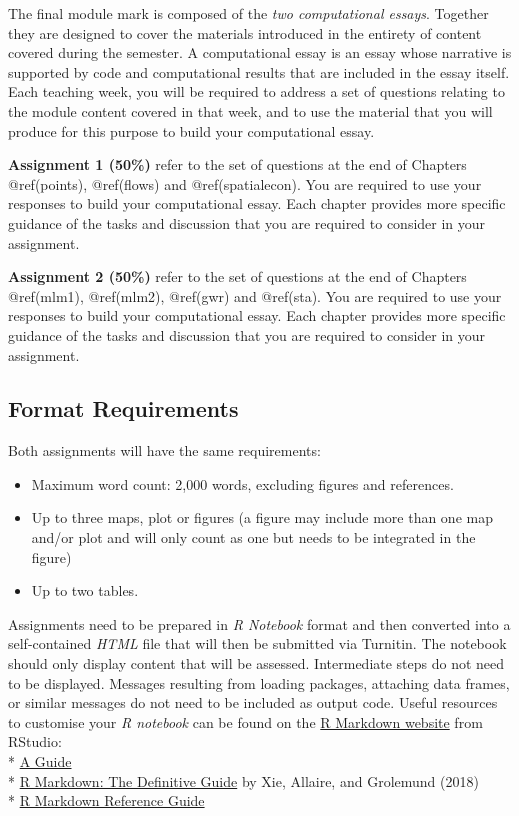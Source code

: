 \documentclass[
  letterpaper,
  krantz2]{style/krantz}
\providecommand{\tightlist}{%
  \setlength{\itemsep}{0pt}\setlength{\parskip}{0pt}}\usepackage{longtable,booktabs,array}
\begin{document}
The final module mark is composed of the \emph{two computational
essays}. Together they are designed to cover the materials introduced in
the entirety of content covered during the semester. A computational
essay is an essay whose narrative is supported by code and computational
results that are included in the essay itself. Each teaching week, you
will be required to address a set of questions relating to the module
content covered in that week, and to use the material that you will
produce for this purpose to build your computational essay.

\textbf{Assignment 1 (50\%)} refer to the set of questions at the end of
Chapters @ref(points), @ref(flows) and @ref(spatialecon). You are
required to use your responses to build your computational essay. Each
chapter provides more specific guidance of the tasks and discussion that
you are required to consider in your assignment.

\textbf{Assignment 2 (50\%)} refer to the set of questions at the end of
Chapters @ref(mlm1), @ref(mlm2), @ref(gwr) and @ref(sta). You are
required to use your responses to build your computational essay. Each
chapter provides more specific guidance of the tasks and discussion that
you are required to consider in your assignment.

\hypertarget{format-requirements}{%
\subsection{Format Requirements}\label{format-requirements}}

Both assignments will have the same requirements:

\begin{itemize}
\tightlist
\item
  Maximum word count: 2,000 words, excluding figures and references.
\item
  Up to three maps, plot or figures (a figure may include more than one
  map and/or plot and will only count as one but needs to be integrated
  in the figure)
\item
  Up to two tables.
\end{itemize}

Assignments need to be prepared in \emph{R Notebook} format and then
converted into a self-contained \emph{HTML} file that will then be
submitted via Turnitin. The notebook should only display content that
will be assessed. Intermediate steps do not need to be displayed.
Messages resulting from loading packages, attaching data frames, or
similar messages do not need to be included as output code. Useful
resources to customise your \emph{R notebook} can be found on the
\href{https://rmarkdown.rstudio.com}{R Markdown website} from RStudio:\\
* \href{https://rmarkdown.rstudio.com/lesson-1.html}{A Guide}\\
* \href{https://bookdown.org/yihui/rmarkdown/}{R Markdown: The
Definitive Guide} by Xie, Allaire, and Grolemund (2018)\\
*
\href{https://rstudio.com/wp-content/uploads/2015/03/rmarkdown-reference.pdf?_ga=2.199646894.1496049738.1611760832-141828105.1610798362}{R
Markdown Reference Guide}
\end{document}
